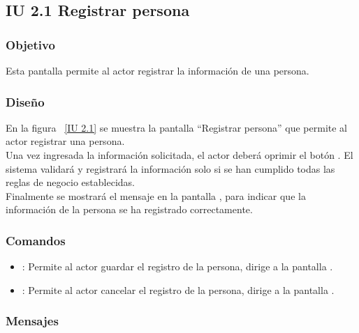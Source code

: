 \subsection{IU 2.1 Registrar persona}

\subsubsection{Objetivo}
	
    Esta pantalla permite al actor registrar la información de una persona.

\subsubsection{Diseño}

    En la figura ~\ref{IU 2.1} se muestra la pantalla ``Registrar persona'' que permite al actor registrar una persona. \\
    
    Una vez ingresada la información solicitada, el actor deberá oprimir el botón . El sistema validará y registrará la 
    información solo si se han cumplido todas las reglas de negocio establecidas.  \\
    
    Finalmente se mostrará el mensaje  en la pantalla , 
    para indicar que la información de la persona
    se ha registrado correctamente.        



\subsubsection{Comandos}
\begin{itemize}
	\item {}: Permite al actor guardar el registro de la persona, dirige a la pantalla .
	\item {}: Permite al actor cancelar el registro de la persona, dirige a la pantalla .
\end{itemize}

\subsubsection{Mensajes}
	
